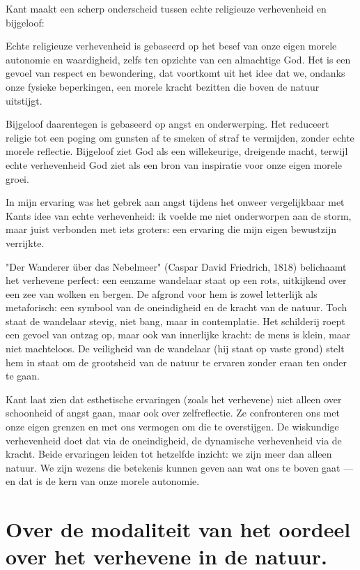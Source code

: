 \begin{mdframed}[leftmargin=0pt,rightmargin=0pt,backgroundcolor=blue!6,linecolor=white,innertopmargin=6pt,innerbottommargin=6pt]
Kant maakt een scherp onderscheid tussen echte religieuze verhevenheid en bijgeloof:
\begin{compactitem}
\item Echte religieuze verhevenheid is gebaseerd op het besef van onze eigen morele autonomie en waardigheid, zelfs ten opzichte van een almachtige God. Het is een gevoel van respect en bewondering, dat voortkomt uit het idee dat we, ondanks onze fysieke beperkingen, een morele kracht bezitten die boven de natuur uitstijgt.
\item Bijgeloof daarentegen is gebaseerd op angst en onderwerping. Het reduceert religie tot een poging om gunsten af te smeken of straf te vermijden, zonder echte morele reflectie. Bijgeloof ziet God als een willekeurige, dreigende macht, terwijl echte verhevenheid God ziet als een bron van inspiratie voor onze eigen morele groei.
\end{compactitem}
In mijn ervaring was het gebrek aan angst tijdens het onweer vergelijkbaar met Kants idee van echte verhevenheid: ik voelde me niet onderworpen aan de storm, maar juist verbonden met iets groters: een ervaring die mijn eigen bewustzijn verrijkte.

"Der Wanderer über das Nebelmeer" (Caspar David Friedrich, 1818) belichaamt het verhevene perfect: een eenzame wandelaar staat op een rots, uitkijkend over een zee van wolken en bergen. De afgrond voor hem is zowel letterlijk als metaforisch: een symbool van de oneindigheid en de kracht van de natuur. Toch staat de wandelaar stevig, niet bang, maar in contemplatie. Het schilderij roept een gevoel van ontzag op, maar ook van innerlijke kracht: de mens is klein, maar niet machteloos. De veiligheid van de wandelaar (hij staat op vaste grond) stelt hem in staat om de grootsheid van de natuur te ervaren zonder eraan ten onder te gaan.

\bigskip
Kant laat zien dat esthetische ervaringen (zoals het verhevene) niet alleen over schoonheid of angst gaan, maar ook over zelfreflectie. Ze confronteren ons met onze eigen grenzen en met ons vermogen om die te overstijgen. De wiskundige verhevenheid doet dat via de oneindigheid, de dynamische verhevenheid via de kracht. Beide ervaringen leiden tot hetzelfde inzicht: we zijn meer dan alleen natuur. We zijn wezens die betekenis kunnen geven aan wat ons te boven gaat — en dat is de kern van onze morele autonomie.

\end{mdframed}

\section{Over de modaliteit van het oordeel over het verhevene in de natuur.}

